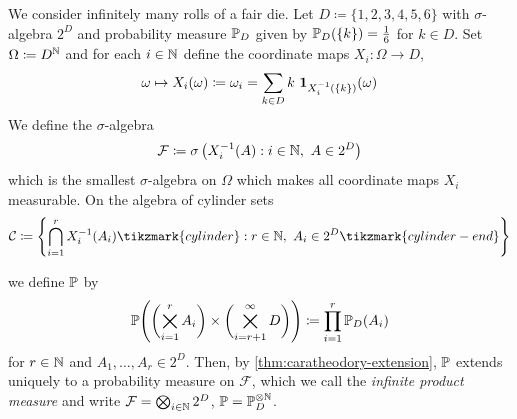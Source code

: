 \begin{example}\label{ex:expectation-dice-rolls}
We consider infinitely many rolls of a fair die.
Let $D \coloneq \{1,2,3,4,5,6\}$ with $\sigma$-algebra $2^D$ and probability measure $\mathbb{P}_D$ given by
\(
\mathbb{P}_D(\{k\}) = \frac{1}{6}
\)
for $k \in D$.
Set
\(
\Omega \coloneq D^{\mathbb{N}}
\)
and for each $i \in \mathbb{N}$ define the coordinate maps
\(
X_i : \Omega \to D
\),
\[
\omega \mapsto X_i(\omega) \coloneq \omega_i = \sum_{k \in D} k \ \mathbf{1}_{X_i^{-1}(\{k\})}(\omega)
\]
We define the $\sigma$-algebra
\[
\mathcal{F}
\coloneq
\sigma\left(X_i^{-1}(A) : i \in \mathbb{N},\ A \in 2^D\right)
\]
which is the smallest $\sigma$-algebra on $\Omega$ which makes all coordinate maps $X_i$ measurable.
On the algebra of cylinder sets
\[
\mathcal{C}
\coloneq
\left\{\bigcap_{i=1}^r X_i^{-1}(A_i) \tikzmark{cylinder} : r \in \N,\ A_i \in 2^D\tikzmark{cylinder-end}\right\}
\]%
\tikzexternaldisable%
%
\tikzexternalenable
we define $\mathbb{P}$ by
\begin{equation}\label{eq:infinite-product-measure}
\mathbb{P}\Biggl(\biggl(\bigtimes_{i=1}^r A_i  \biggr) \times \biggl(\bigtimes_{i=r+1}^\infty D \biggr) \Biggr)
\coloneq
\prod_{i=1}^r \mathbb{P}_D(A_i)
\end{equation}
for $r \in \mathbb{N}$ and $A_1,\ldots,A_r \in 2^D$.
Then, by \autoref{thm:caratheodory-extension}, $\mathbb{P}$ extends uniquely to a probability measure on $\mathcal{F}$, which we call the \emph{infinite product measure} and write
\(
\mathcal{F}
=
\bigotimes_{i \in \mathbb{N}} 2^D
\),
\(
\mathbb{P}
=
\mathbb{P}_D^{\otimes \mathbb{N}}
\).%


\end{example}
